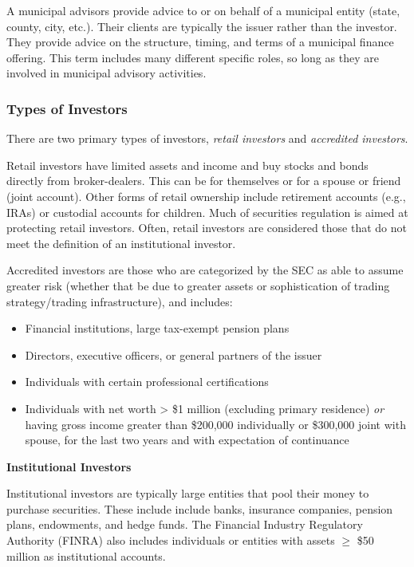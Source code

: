 A municipal advisors provide advice to or on behalf of a municipal entity (state, county, city, etc.). Their clients are typically the issuer rather than the investor. They provide advice on the structure, timing, and terms of a municipal finance offering. This term includes many different specific roles, so long as they are involved in municipal advisory activities. 

\medskip

\subsubsection{Types of Investors}

There are two primary types of investors, \textit{retail investors} and \textit{accredited investors}.

Retail investors have limited assets and income and buy stocks and bonds directly from broker-dealers. This can be for themselves or for a spouse or friend (joint account). Other forms of retail ownership include retirement accounts (e.g., IRAs) or custodial accounts for children. Much of securities regulation is aimed at protecting retail investors. Often, retail investors are considered those that do not meet the definition of an institutional investor.

Accredited investors are those who are categorized by the SEC as able to assume greater risk (whether that be due to greater assets or sophistication of trading strategy/trading infrastructure), and includes:
\vspace{-1.5ex}
\begin{itemize}[label=$\circ$, itemsep=0.4em]
\item Financial institutions, large tax-exempt pension plans
\item Directors, executive officers, or general partners of the issuer
\item Individuals with certain professional certifications
\item Individuals with net worth > \$1 million (excluding primary residence) \textit{or} having gross income greater than \$200,000 individually or \$300,000 joint with spouse, for the last two years and with expectation of continuance
\end{itemize}

\medskip

\textbf{Institutional Investors}

Institutional investors are typically large entities that pool their money to purchase securities. These include include banks, insurance companies, pension plans, endowments, and hedge funds. The Financial Industry Regulatory Authority (FINRA) also includes individuals or entities with assets $\geq$ \$50 million as institutional accounts. 

